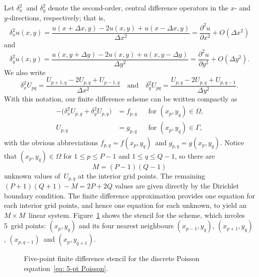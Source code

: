 Let $\delta_x^2$~and $\delta_y^2$ denote the second-order, central difference 
operators in the $x$- and $y$-directions, respectively; that is,
\[
\delta_x^2u(x,y)=\frac{u(x+\Delta x,y)-2u(x,y)+u(x-\Delta x,y)}{\Delta x^2}
    =\frac{\partial^2u}{\partial x^2}+O(\Delta x^2)
\]
and
\[
\delta_y^2u(x,y)=\frac{u(x,y+\Delta y)-2u(x,y)+u(x,y-\Delta y)}{\Delta y^2}
    =\frac{\partial^2u}{\partial y^2}+O(\Delta y^2).
\]
We also write
\[
\delta_x^2U_{pq}=\frac{U_{p+1,q}-2U_{p,q}+U_{p-1,q}}{\Delta x^2}
\quad\text{and}\quad
\delta_y^2U_{pq}=\frac{U_{p,q}-2U_{p,q}+U_{p,q-1}}{\Delta y^2}.
\]
With this notation, our finite difference scheme can be written compactly as
\begin{equation}\label{eq: 5-pt Poisson}
\begin{aligned}
-\bigl(\delta_x^2U_{p,q}+\delta_y^2U_{p,q}\bigr)&=f_{p,q}
    &&\text{for $(x_p,y_q)\in\Omega$,}\\
U_{p,q}&=g_{p,q}&&\text{for $(x_p,y_q)\in\Gamma$,}
\end{aligned}
\end{equation}
with the obvious abbreviations $f_{p,q}=f(x_p,y_q)$~and $g_{p,q}=g(x_p,y_q)$.
Notice that $(x_p,y_q)\in\Omega$ for $1\le p\le P-1$ and $1\le q\le Q-1$, so 
there are 
\[
M=(P-1)(Q-1)
\]
unknown values of~$U_{p,q}$ at the interior grid points.  The remaining
$(P+1)(Q+1)-M=2P+2Q$ values are given directly by the Dirichlet boundary 
condition.  The finite difference approximation provides one equation for 
each interior grid points, and hence one equation for each unknown, to yield an 
$M\times M$~linear system.  Figure~\ref{fig: 5-pt stencil} shows the stencil 
for the scheme, which involes 5~grid points: $(x_p,y_q)$ and its four nearest 
neighbours $(x_{p-1},y_q)$, $(x_{p+1},y_q)$, $(x_{p,q-1})$~and 
$(x_p,y_{q+1})$.

\begin{figure}
\caption{Five-point finite difference stencil for the discrete Poisson 
equation~\eqref{eq: 5-pt Poisson}.}\label{fig: 5-pt stencil}
\begin{center}
\end{center}
\end{figure}

